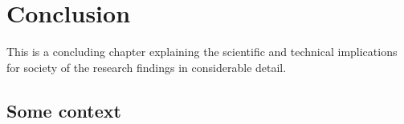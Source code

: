 %
%
%




\chapter[Conclusion]{Conclusion}\label{app:chapterx}

This is a concluding chapter explaining the scientific and technical
implications for society of the research findings in considerable detail.


\lipsum[1]

\section{Some context}
\lipsum[2-4]

